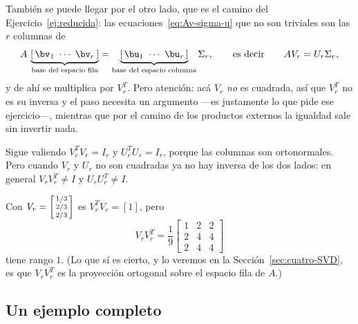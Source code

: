 También se puede llegar por el otro lado, que es el camino del
Ejercicio~\ref{ej:reducida}: las ecuaciones~\eqref{eq:Av-sigma-u} que no son
triviales son las $r$ columnas de
\begin{equation}\label{eq:SVD-reducida}
A\,\underbrace{[\,\bv_1\ \cdots\ \bv_r\,]}_{\text{base del espacio fila}}
=\underbrace{[\,\bu_1\ \cdots\ \bu_r\,]}_{\text{base del espacio columna}}
\Sigma_r ,
\qquad\text{es decir}\qquad
AV_r=U_r\Sigma_r ,
\end{equation}
y de ahí se multiplica por $V_r^T$. Pero atención: acá $V_r$ \emph{no} es
cuadrada, así que $V_r^T$ no es su inversa y el paso necesita un argumento
---es justamente lo que pide ese ejercicio---, mientras que por el camino de
los productos externos la igualdad sale sin invertir nada.

Sigue valiendo $V_r^TV_r=I_r$ y $U_r^TU_r=I_r$, porque las columnas son
ortonormales. Pero cuando $V_r$ y $U_r$ no son cuadradas ya no hay inversa de
los dos lados: en general $V_rV_r^T\neq I$ y $U_rU_r^T\neq I$.

\begin{example}
Con $V_r=\begin{bsmallmatrix}1/3\\ 2/3\\ 2/3\end{bsmallmatrix}$ es
$V_r^TV_r=[1]$, pero
\[
V_rV_r^T=\frac19\begin{bmatrix}1&2&2\\ 2&4&4\\ 2&4&4\end{bmatrix}
\]
tiene rango $1$. (Lo que sí es cierto, y lo veremos en la
Sección~\ref{sec:cuatro-SVD}, es que $V_rV_r^T$ es la proyección ortogonal
sobre el espacio fila de $A$.)
\end{example}

\subsection{Un ejemplo completo}

